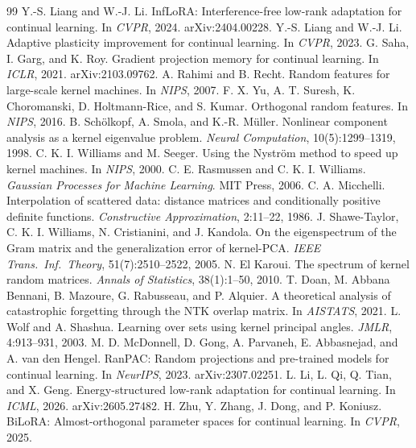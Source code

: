 \documentclass[11pt]{article}
\theoremstyle{plain}
\theoremstyle{definition}
\theoremstyle{remark}
\begin{document}
\begin{thebibliography}{99}
 Y.-S. Liang and W.-J. Li. InfLoRA: Interference-free low-rank adaptation for continual learning. In \emph{CVPR}, 2024. arXiv:2404.00228.
 Y.-S. Liang and W.-J. Li. Adaptive plasticity improvement for continual learning. In \emph{CVPR}, 2023.
 G. Saha, I. Garg, and K. Roy. Gradient projection memory for continual learning. In \emph{ICLR}, 2021. arXiv:2103.09762.
 A. Rahimi and B. Recht. Random features for large-scale kernel machines. In \emph{NIPS}, 2007.
 F. X. Yu, A. T. Suresh, K. Choromanski, D. Holtmann-Rice, and S. Kumar. Orthogonal random features. In \emph{NIPS}, 2016.
 B. Sch\"olkopf, A. Smola, and K.-R. M\"uller. Nonlinear component analysis as a kernel eigenvalue problem. \emph{Neural Computation}, 10(5):1299--1319, 1998.
 C. K. I. Williams and M. Seeger. Using the Nystr\"om method to speed up kernel machines. In \emph{NIPS}, 2000.
 C. E. Rasmussen and C. K. I. Williams. \emph{Gaussian Processes for Machine Learning}. MIT Press, 2006.
 C. A. Micchelli. Interpolation of scattered data: distance matrices and conditionally positive definite functions. \emph{Constructive Approximation}, 2:11--22, 1986.
 J. Shawe-Taylor, C. K. I. Williams, N. Cristianini, and J. Kandola. On the eigenspectrum of the Gram matrix and the generalization error of kernel-PCA. \emph{IEEE Trans.\ Inf.\ Theory}, 51(7):2510--2522, 2005.
 N. El Karoui. The spectrum of kernel random matrices. \emph{Annals of Statistics}, 38(1):1--50, 2010.
 T. Doan, M. Abbana Bennani, B. Mazoure, G. Rabusseau, and P. Alquier. A theoretical analysis of catastrophic forgetting through the NTK overlap matrix. In \emph{AISTATS}, 2021.
 L. Wolf and A. Shashua. Learning over sets using kernel principal angles. \emph{JMLR}, 4:913--931, 2003.
 M. D. McDonnell, D. Gong, A. Parvaneh, E. Abbasnejad, and A. van den Hengel. RanPAC: Random projections and pre-trained models for continual learning. In \emph{NeurIPS}, 2023. arXiv:2307.02251.
 L. Li, L. Qi, Q. Tian, and X. Geng. Energy-structured low-rank adaptation for continual learning. In \emph{ICML}, 2026. arXiv:2605.27482.
 H. Zhu, Y. Zhang, J. Dong, and P. Koniusz. BiLoRA: Almost-orthogonal parameter spaces for continual learning. In \emph{CVPR}, 2025.
\end{thebibliography}
\end{document}
